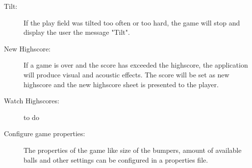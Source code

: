 \documentclass[fontsize=12pt,
               paper=a4,
               twoside=false,
               parskip=half,
               ]{scrartcl}
\begin{document}
\begin{description}
\item[Tilt:] If the play field was tilted too often or too hard, the game will stop and display the user the message "Tilt".

\item[New Highscore:] If a game is over and the score has exceeded the highscore, the application will produce visual and acoustic effects. The score will be set as new highscore and the new highscore sheet is presented to the player.

\item[Watch Highscores:] 
to do

\item[Configure game properties:] The properties of the game like size of the bumpers, amount of available balls and other settings can be configured in a properties file.

\end{description}







\end{document}
